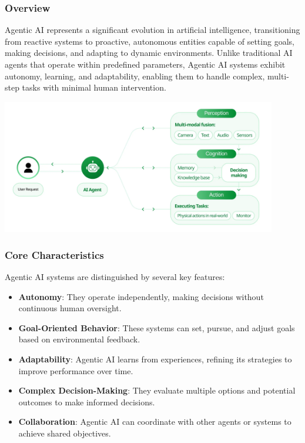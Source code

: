 \subsubsection{Overview}
Agentic AI represents a significant evolution in artificial intelligence, transitioning from reactive systems to proactive, autonomous entities capable of setting goals, making decisions, and adapting to dynamic environments. Unlike traditional AI agents that operate within predefined parameters, Agentic AI systems exhibit autonomy, learning, and adaptability, enabling them to handle complex, multi-step tasks with minimal human intervention.

\begin{center}
    \centering
    \includegraphics[width=0.9\textwidth]{Images/agentic_ai_architecture.png}
     \cite{agenticAIArchitecture}
    \label{fig:agentic_ai_architecture}
\end{center}

\subsubsection{Core Characteristics}
Agentic AI systems are distinguished by several key features:

\begin{itemize}
    \item \textbf{Autonomy}: They operate independently, making decisions without continuous human oversight.
    \item \textbf{Goal-Oriented Behavior}: These systems can set, pursue, and adjust goals based on environmental feedback.
    \item \textbf{Adaptability}: Agentic AI learns from experiences, refining its strategies to improve performance over time.
    \item \textbf{Complex Decision-Making}: They evaluate multiple options and potential outcomes to make informed decisions.
    \item \textbf{Collaboration}: Agentic AI can coordinate with other agents or systems to achieve shared objectives.
\end{itemize}

